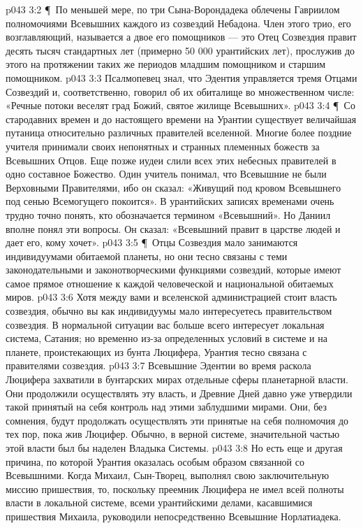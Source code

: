 \vs p043 3:2 \P\ По меньшей мере, по три Сына\hyp{}Ворондадека облечены Гавриилом полномочиями Всевышних каждого из созвездий Небадона. Член этого трио, его возглавляющий, называется  а двое его помощников --- это  Отец Созвездия правит десять тысяч стандартных лет (примерно 50 000 урантийских лет), прослужив до этого на протяжении таких же периодов младшим помощником и старшим помощником.
\vs p043 3:3 Псалмопевец знал, что Эдентия управляется тремя Отцами Созвездий и, соответственно, говорил об их обиталище во множественном числе: «Речные потоки веселят град Божий, святое жилище Всевышних».
\vs p043 3:4 \P\ Со стародавних времен и до настоящего времени на Урантии существует величайшая путаница относительно различных правителей вселенной. Многие более поздние учителя принимали своих непонятных и странных племенных божеств за Всевышних Отцов. Еще позже иудеи слили всех этих небесных правителей в одно составное Божество. Один учитель понимал, что Всевышние не были Верховными Правителями, ибо он сказал: «Живущий под кровом Всевышнего под сенью Всемогущего покоится». В урантийских записях временами очень трудно точно понять, кто обозначается термином «Всевышний». Но Даниил вполне понял эти вопросы. Он сказал: «Всевышний правит в царстве людей и дает его, кому хочет».
\vs p043 3:5 \P\ Отцы Созвездия мало занимаются индивидуумами обитаемой планеты, но они тесно связаны с теми законодательными и законотворческими функциями созвездий, которые имеют самое прямое отношение к каждой человеческой  и национальной  обитаемых миров.
\vs p043 3:6 Хотя между вами и вселенской администрацией стоит власть созвездия, обычно вы как индивидуумы мало интересуетесь правительством созвездия. В нормальной ситуации вас больше всего интересует локальная система, Сатания; но временно из\hyp{}за определенных условий в системе и на планете, проистекающих из бунта Люцифера, Урантия тесно связана с правителями созвездия.
\vs p043 3:7 Всевышние Эдентии во время раскола Люцифера захватили в бунтарских мирах отдельные сферы планетарной власти. Они продолжили осуществлять эту власть, и Древние Дней давно уже утвердили такой принятый на себя контроль над этими заблудшими мирами. Они, без сомнения, будут продолжать осуществлять эти принятые на себя полномочия до тех пор, пока жив Люцифер. Обычно, в верной системе, значительной частью этой власти был бы наделен Владыка Системы.
\vs p043 3:8 Но есть еще и другая причина, по которой Урантия оказалась особым образом связанной со Всевышними. Когда Михаил, Сын\hyp{}Творец, выполнял свою заключительную миссию пришествия, то, поскольку преемник Люцифера не имел всей полноты власти в локальной системе, всеми урантийскими делами, касавшимися пришествия Михаила, руководили непосредственно Всевышние Норлатиадека.
